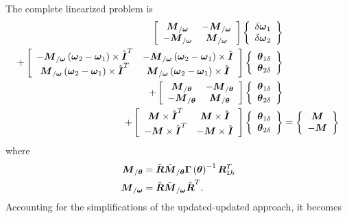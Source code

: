 \documentclass[10pt,dvips,fleqn,subeqn]{report}
\newcommand{\T}[1]{\boldsymbol{#1}}
\begin{document}
The complete linearized problem is
\begin{align}
	\sqbr{\matr{cc}{
		\T{M}_{/\T{\omega}} & - \T{M}_{/\T{\omega}} \\
		- \T{M}_{/\T{\omega}} & \T{M}_{/\T{\omega}}
	}} \cubr{\cvvect{
		\delta\T{\omega}_1 \\
		\delta\T{\omega}_2
	}} & \nonumber \\
	+ \sqbr{\matr{cc}{
		- \T{M}_{/\T{\omega}} \plbr{\T{\omega}_2 - \T{\omega}_1}\times \hat{\T{I}}^T
			& - \T{M}_{/\T{\omega}} \plbr{\T{\omega}_2 - \T{\omega}_1}\times \hat{\T{I}} \\
		\T{M}_{/\T{\omega}} \plbr{\T{\omega}_2 - \T{\omega}_1}\times \hat{\T{I}}^T
			& \T{M}_{/\T{\omega}} \plbr{\T{\omega}_2 - \T{\omega}_1}\times \hat{\T{I}}
	}} \cubr{\cvvect{
		\T{\theta}_{1\delta} \\
		\T{\theta}_{2\delta}
	}} & \nonumber \\
	+ \sqbr{\matr{cc}{
		\T{M}_{/\T{\theta}} & - \T{M}_{/\T{\theta}} \\
		- \T{M}_{/\T{\theta}} & \T{M}_{/\T{\theta}}
	}} \cubr{\cvvect{
		\T{\theta}_{1\delta} \\
		\T{\theta}_{2\delta}
	}} & \nonumber \\
	+ \sqbr{\matr{cc}{
		\T{M} \times \hat{\T{I}}^T & \T{M} \times \hat{\T{I}} \\
		- \T{M} \times \hat{\T{I}}^T & - \T{M} \times \hat{\T{I}}
	}} \cubr{\cvvect{
		\T{\theta}_{1\delta} \\
		\T{\theta}_{2\delta}
	}} &= \cubr{\cvvect{
		\T{M} \\
		- \T{M}
	}}
\end{align}
where
\begin{align}
	\T{M}_{/\T{\theta}} &= \hat{\T{R}} \tilde{\T{M}}_{/\T{\theta}} \T{\Gamma}\plbr{\T{\theta}}^{-1} \T{R}_{1h}^T \\
	\T{M}_{/\T{\omega}} &= \hat{\T{R}} \tilde{\T{M}}_{/\T{\omega}} \hat{\T{R}}^T .
\end{align}
Accounting for the simplifications of the updated-updated approach, it becomes
\end{document}
